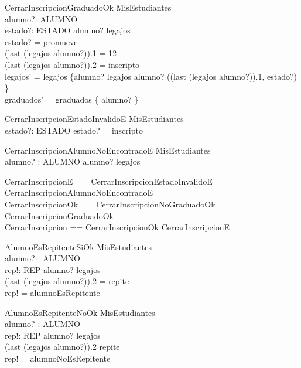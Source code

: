\begin{schema}{CerrarInscripcionGraduadoOk}
    \Delta MisEstudiantes \\
    alumno?: ALUMNO \\
    estado?: ESTADO
    \where
    alumno? \in \dom legajos \\
    estado? = promueve \\
    (last \; (legajos \; alumno?)).1 = 12 \\
    (last \; (legajos \; alumno?)).2 = inscripto \\
    legajos' = legajos \oplus \{alumno? \mapsto legajos \; alumno? \cat \langle ((last \; (legajos \; alumno?)).1, estado?) \rangle\} \\
    graduados' = graduados \cup \{ alumno? \}
\end{schema}

\begin{schema}{CerrarInscripcionEstadoInvalidoE}
    \Xi MisEstudiantes \\
    estado?: ESTADO
    \where
    estado? = inscripto
\end{schema}

\begin{schema}{CerrarInscripcionAlumnoNoEncontradoE}
    \Xi MisEstudiantes \\
    alumno? : ALUMNO
    \where
    alumno? \notin \dom legajos
\end{schema}

\begin{zed}
    CerrarInscripcionE == CerrarInscripcionEstadoInvalidoE \lor CerrarInscripcionAlumnoNoEncontradoE \\
    CerrarInscripcionOk == CerrarInscripcionNoGraduadoOk \lor CerrarInscripcionGraduadoOk \\
    CerrarInscripcion == CerrarInscripcionOk \lor CerrarInscripcionE
\end{zed}

\begin{schema}{AlumnoEsRepitenteSiOk}
    \Xi MisEstudiantes \\
    alumno? : ALUMNO \\
    rep!: REP
    \where
    alumno? \in \dom legajos \\
    (last \; (legajos \; alumno?)).2 = repite \\
    rep! = alumnoEsRepitente
\end{schema}

\begin{schema}{AlumnoEsRepitenteNoOk}
    \Xi MisEstudiantes \\
    alumno? : ALUMNO \\
    rep!: REP
    \where
    alumno? \in \dom legajos \\
    (last \; (legajos \; alumno?)).2 \neq repite \\
    rep! = alumnoNoEsRepitente
\end{schema}

